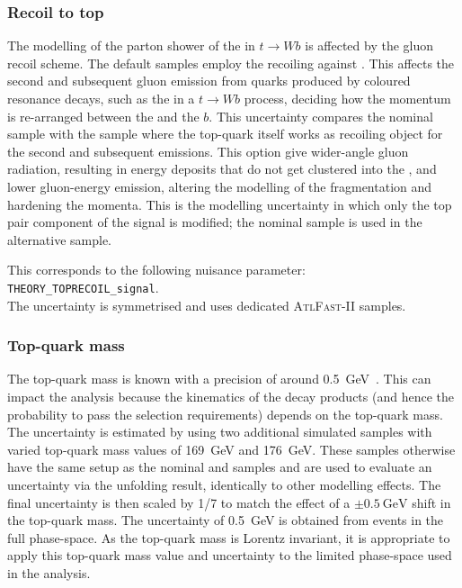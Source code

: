 
\subsubsection{Recoil to top}%
\label{sec:systematics:recoil-to-top}
The modelling of the parton shower of the \bquarks in \( t \rightarrow W b \)
is affected by the gluon recoil scheme. The default samples employ the recoiling
against \bquarks. This affects the second and subsequent gluon emission from
quarks produced by coloured resonance decays, such as the \bquark in
a \( t \rightarrow W b \) process, deciding how the momentum is re-arranged
between the \Wboson and the \(b\). This uncertainty compares the nominal sample
with the sample where the top-quark itself works as recoiling object for the
second and subsequent emissions. This option give wider-angle gluon radiation,
resulting in energy deposits that do not get clustered into the \bjet,
and lower gluon-energy emission, altering the modelling of the \bquark
fragmentation and hardening the \bhadron momenta.
This is the modelling uncertainty in which only the top pair component
of the signal is modified; the nominal \tW sample is used in the alternative
sample.

This corresponds to the following nuisance parameter: \texttt{THEORY\_TOPRECOIL\_signal}.
\\The uncertainty is symmetrised and uses dedicated \textsc{AtlFast-II} samples.

\subsubsection{Top-quark mass}%
\label{sec:systematics:topmass}
The top-quark mass is known with a precision of around \qty{0.5}{\GeV}~\cite{TOPQ-2017-03}.
This can impact the analysis because the kinematics of the decay products
(and hence the probability to pass the selection requirements) depends
on the top-quark mass. The uncertainty is estimated by using two additional
simulated samples with varied top-quark mass values of \qty{169}{\GeV} and
\qty{176}{\GeV}. These samples otherwise have the same setup as the nominal
\ttbar and \tW samples and are used to evaluate an uncertainty via
the unfolding result, identically to other modelling effects.
The final uncertainty is then scaled by 1/7 to match the effect of
a \( \pm \qty{0.5}{\GeV} \) shift in the top-quark mass.
The uncertainty of \qty{0.5}{\GeV} is obtained from events in the full phase-space.
As the top-quark mass is Lorentz invariant, it is appropriate to apply this
top-quark mass value and uncertainty to the limited phase-space used in the analysis. 


